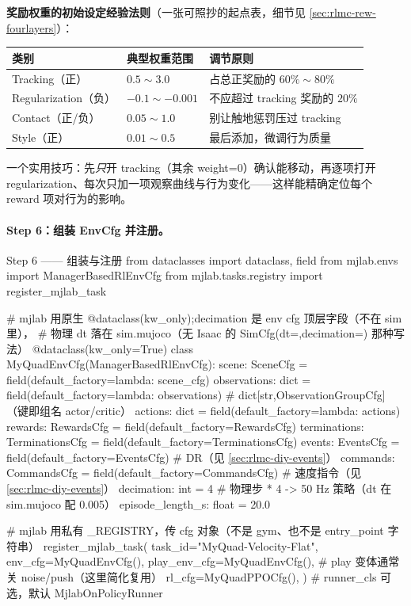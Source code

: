 \textbf{奖励权重的初始设定经验法则}（一张可照抄的起点表，细节见 \cref{sec:rlmc-rew-fourlayers}）：

\begin{center}
\small
\begin{tabular}{@{}llp{6.0cm}@{}}
\toprule
类别 & 典型权重范围 & 调节原则 \\
\midrule
Tracking（正） & $0.5 \sim 3.0$ & 占总正奖励的 $60\%\sim 80\%$ \\
Regularization（负） & $-0.1 \sim -0.001$ & 不应超过 tracking 奖励的 $20\%$ \\
Contact（正/负） & $0.05 \sim 1.0$ & 别让触地惩罚压过 tracking \\
Style（正） & $0.01 \sim 0.5$ & 最后添加，微调行为质量 \\
\bottomrule
\end{tabular}
\end{center}

一个实用技巧：先\emph{只}开 tracking（其余 weight=0）确认能移动，再逐项打开 regularization、每次只加一项观察曲线与行为变化——这样能精确定位每个 reward 项对行为的影响。

\paragraph{Step 6：组装 EnvCfg 并注册。}

\begin{codebox}[Python]{Step 6 —— 组装与注册}
from dataclasses import dataclass, field
from mjlab.envs import ManagerBasedRlEnvCfg
from mjlab.tasks.registry import register_mjlab_task

# mjlab 用原生 @dataclass(kw_only);decimation 是 env cfg 顶层字段（不在 sim 里），
# 物理 dt 落在 sim.mujoco（无 Isaac 的 SimCfg(dt=,decimation=) 那种写法）
@dataclass(kw_only=True)
class MyQuadEnvCfg(ManagerBasedRlEnvCfg):
    scene:        SceneCfg          = field(default_factory=lambda: scene_cfg)
    observations: dict              = field(default_factory=lambda: observations)  # dict[str,ObservationGroupCfg]（键即组名 actor/critic）
    actions:      dict              = field(default_factory=lambda: actions)
    rewards:      RewardsCfg        = field(default_factory=RewardsCfg)
    terminations: TerminationsCfg   = field(default_factory=TerminationsCfg)
    events:       EventsCfg         = field(default_factory=EventsCfg)   # DR（见 \cref{sec:rlmc-diy-events}）
    commands:     CommandsCfg       = field(default_factory=CommandsCfg) # 速度指令（见 \cref{sec:rlmc-diy-events}）
    decimation:        int   = 4           # 物理步 * 4 -> 50 Hz 策略（dt 在 sim.mujoco 配 0.005）
    episode_length_s:  float = 20.0

# mjlab 用私有 _REGISTRY，传 cfg 对象（不是 gym、也不是 entry_point 字符串）
register_mjlab_task(
    task_id="MyQuad-Velocity-Flat",
    env_cfg=MyQuadEnvCfg(),
    play_env_cfg=MyQuadEnvCfg(),       # play 变体通常关 noise/push（这里简化复用）
    rl_cfg=MyQuadPPOCfg(),
)   # runner_cls 可选，默认 MjlabOnPolicyRunner
\end{codebox}

